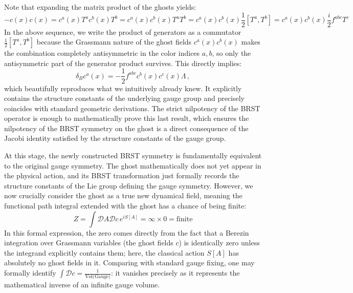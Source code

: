 Note that expanding the matrix product of the ghosts yields:
\begin{equation} \label{eq:49}
    -c(x)c(x) = c^a(x)T^a c^b(x)T^b = c^a(x)c^b(x)T^a T^b = c^a(x)c^b(x)\frac{1}{2}[T^a, T^b] = c^a(x)c^b(x)\frac{i}{2}f^{abc}T^c
\end{equation}
In the above sequence, we write the product of generators as a commutator \(\frac{1}{2}[T^a, T^b]\) because the Grassmann nature of the ghost fields \(c^a(x)c^b(x)\) makes the combination completely antisymmetric in the color indices \(a, b\), so only the antisymmetric part of the generator product survives. This directly implies:
\begin{equation} \label{eq:50}
    \delta_B c^a(x) = -\frac{1}{2} f^{abc} c^b(x) c^c(x) \Lambda \, ,
\end{equation}
which beautifully reproduces what we intuitively already knew. It explicitly contains the structure constants of the underlying gauge group and precisely coincides with standard geometric derivations. The strict nilpotency of the BRST operator is enough to mathematically prove this last result, which ensures the nilpotency of the BRST symmetry on the ghost is a direct consequence of the Jacobi identity satisfied by the structure constants of the gauge group.

At this stage, the newly constructed BRST symmetry is fundamentally equivalent to the original gauge symmetry. The ghost mathematically does not yet appear in the physical action, and its BRST transformation just formally records the structure constants of the Lie group defining the gauge symmetry. However, we now crucially consider the ghost as a true new dynamical field, meaning the functional path integral extended with the ghost has a chance of being finite:
\begin{equation} \label{eq:51}
    Z = \int \mathcal{D}A \mathcal{D}c \, e^{iS[A]} = \infty \times 0 = \text{finite}
\end{equation}
In this formal expression, the zero comes directly from the fact that a Berezin integration over Grassmann variables (the ghost fields \(c\)) is identically zero unless the integrand explicitly contains them; here, the classical action \(S[A]\) has absolutely no ghost fields in it. Comparing with standard gauge fixing, one may formally identify \(\int \mathcal{D}c = \frac{1}{\text{Vol(Gauge)}}\): it vanishes precisely as it represents the mathematical inverse of an infinite gauge volume.

